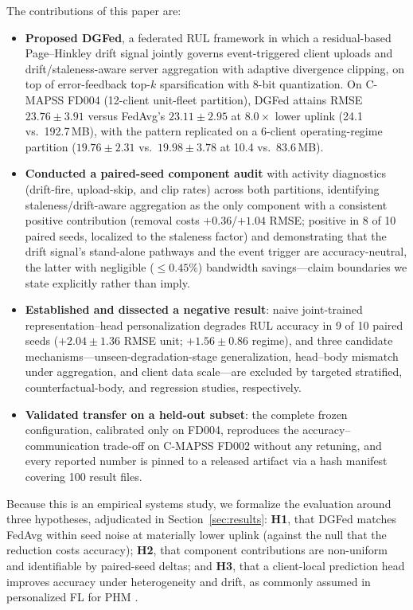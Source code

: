 \documentclass[journal]{IEEEtran}
\newcommand{\dgfed}{DGFed}
\begin{document}
The contributions of this paper are:
\begin{itemize}
\item \textbf{Proposed \dgfed{}}, a federated RUL framework in which a residual-based Page--Hinkley drift signal jointly governs event-triggered client uploads and drift/staleness-aware server aggregation with adaptive divergence clipping, on top of error-feedback top-$k$ sparsification with 8-bit quantization. On C-MAPSS FD004 (12-client unit-fleet partition), \dgfed{} attains RMSE $23.76 \pm 3.91$ versus FedAvg's $23.11 \pm 2.95$ at $8.0\times$ lower uplink (24.1 vs.\ 192.7\,MB), with the pattern replicated on a 6-client operating-regime partition ($19.76 \pm 2.31$ vs.\ $19.98 \pm 3.78$ at 10.4 vs.\ 83.6\,MB).
\item \textbf{Conducted a paired-seed component audit} with activity diagnostics (drift-fire, upload-skip, and clip rates) across both partitions, identifying staleness/drift-aware aggregation as the only component with a consistent positive contribution (removal costs $+0.36$/$+1.04$ RMSE; positive in 8 of 10 paired seeds, localized to the staleness factor) and demonstrating that the drift signal's stand-alone pathways and the event trigger are accuracy-neutral, the latter with negligible ($\leq 0.45\%$) bandwidth savings---claim boundaries we state explicitly rather than imply.
\item \textbf{Established and dissected a negative result}: naive joint-trained representation--head personalization degrades RUL accuracy in 9 of 10 paired seeds ($+2.04 \pm 1.36$ RMSE unit; $+1.56 \pm 0.86$ regime), and three candidate mechanisms---unseen-degradation-stage generalization, head--body mismatch under aggregation, and client data scale---are excluded by targeted stratified, counterfactual-body, and regression studies, respectively.
\item \textbf{Validated transfer on a held-out subset}: the complete frozen configuration, calibrated only on FD004, reproduces the accuracy--communication trade-off on C-MAPSS FD002 without any retuning, and every reported number is pinned to a released artifact via a hash manifest covering 100 result files.
\end{itemize}

Because this is an empirical systems study, we formalize the evaluation around three hypotheses, adjudicated in Section~\ref{sec:results}: \textbf{H1}, that \dgfed{} matches FedAvg within seed noise at materially lower uplink (against the null that the reduction costs accuracy); \textbf{H2}, that component contributions are non-uniform and identifiable by paired-seed deltas; and \textbf{H3}, that a client-local prediction head improves accuracy under heterogeneity and drift, as commonly assumed in personalized FL for PHM \cite{collins2021fedrep,chen2023ghdr,chen2024bearing}.
\end{document}
